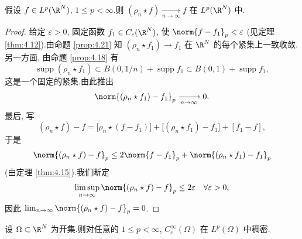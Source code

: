 \begin{keytheorem}
\label{thm:4.22}
假设 $f\in L^p(\R^N)$, $1\le p<\infty$.则
$(\rho_n\star f)\xrightarrow[n\to\infty]{}f$ 在 $L^p(\R^N)$ 中.
\end{keytheorem}

\begin{proof}
给定 $\varepsilon>0$, 固定函数 $f_1\in C_c(\R^N)$, 使
$\norm{f-f_1}_p<\varepsilon$ (见定理  \ref{thm:4.12}).由命题  \ref{prop:4.21} 知
$(\rho_n\star f_1)\to f_1$ 在 $\R^N$ 的每个紧集上一致收敛.另一方面, 由命题
 \ref{prop:4.18} 有
\begin{equation*}
\operatorname{supp}(\rho_n\star f_1)\subset B(0,1/n)+\operatorname{supp}f_1
\subset B(0,1)+\operatorname{supp}f_1,
\end{equation*}
这是一个固定的紧集.由此推出
\begin{equation*}
\norm{(\rho_n\star f_1)-f_1}_p\xrightarrow[n\to\infty]{}0.
\end{equation*}
最后, 写
\begin{equation*}
(\rho_n\star f)-f=\bigl[\rho_n\star(f-f_1)\bigr]
+\bigl[(\rho_n\star f_1)-f_1\bigr]+[f_1-f],
\end{equation*}
于是
\begin{equation*}
\norm{(\rho_n\star f)-f}_p\le2\norm{f-f_1}_p+\norm{(\rho_n\star f_1)-f_1}_p
\end{equation*}
(由定理  \ref{thm:4.15}).我们断定
\begin{equation*}
\limsup_{n\to\infty}\norm{(\rho_n\star f)-f}_p\le2\varepsilon
\quad\forall\varepsilon>0,
\end{equation*}
因此 $\lim_{n\to\infty}\norm{(\rho_n\star f)-f}_p=0$.
\end{proof}

\begin{keycorollary}
\label{cor:4.23}
设 $\Omega\subset\R^N$ 为开集.则对任意的 $1\le p<\infty$,
$C_c^\infty(\Omega)$ 在 $L^p(\Omega)$ 中稠密.
\end{keycorollary}

